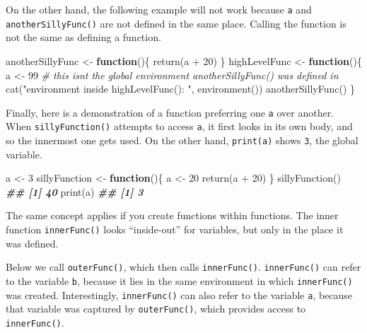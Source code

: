 \documentclass[
  12pt,
]{krantz}
\makeatletter
\newenvironment{Shaded}{\begin{snugshade}}{\end{snugshade}}
\newcommand{\CommentTok}[1]{\textcolor[rgb]{0.37,0.37,0.37}{\textit{#1}}}
\newcommand{\ControlFlowTok}[1]{\textcolor[rgb]{0.27,0.27,0.27}{\textbf{#1}}}
\newcommand{\DecValTok}[1]{\textcolor[rgb]{0.06,0.06,0.06}{#1}}
\newcommand{\DocumentationTok}[1]{\textcolor[rgb]{0.37,0.37,0.37}{\textbf{\textit{#1}}}}
\newcommand{\FunctionTok}[1]{\textcolor[rgb]{0,0,0}{#1}}
\newcommand{\NormalTok}[1]{#1}
\newcommand{\OtherTok}[1]{\textcolor[rgb]{0.37,0.37,0.37}{#1}}
\newcommand{\SpecialCharTok}[1]{\textcolor[rgb]{0,0,0}{#1}}
\newcommand{\StringTok}[1]{\textcolor[rgb]{0.5,0.5,0.5}{#1}}
\newenvironment{kframe}{%
\medskip{}
\setlength{\fboxsep}{.8em}
 \def\at@end@of@kframe{}%
 \ifinner\ifhmode%
  \def\at@end@of@kframe{\end{minipage}}%
  \begin{minipage}{\columnwidth}%
 \fi\fi%
 \def\FrameCommand##1{\hskip\@totalleftmargin \hskip-\fboxsep
 \colorbox{shadecolor}{##1}\hskip-\fboxsep
     \hskip-\linewidth \hskip-\@totalleftmargin \hskip\columnwidth}%
 \MakeFramed {\advance\hsize-\width
   \@totalleftmargin\z@ \linewidth\hsize
   \@setminipage}}%
 {\par\unskip\endMakeFramed%
 \at@end@of@kframe}
\renewenvironment{Shaded}{\begin{kframe}}{\end{kframe}}
\makeatother
\begin{document}
On the other hand, the following example will not work because \texttt{a} and \texttt{anotherSillyFunc()} are not defined in the same place. Calling the function is not the same as defining a function.

\begin{Shaded}
\begin{Highlighting}[]
\NormalTok{anotherSillyFunc }\OtherTok{\textless{}{-}} \ControlFlowTok{function}\NormalTok{()\{}
  \FunctionTok{return}\NormalTok{(a }\SpecialCharTok{+} \DecValTok{20}\NormalTok{) }
\NormalTok{\}}
\NormalTok{highLevelFunc }\OtherTok{\textless{}{-}} \ControlFlowTok{function}\NormalTok{()\{}
\NormalTok{  a }\OtherTok{\textless{}{-}} \DecValTok{99}
  \CommentTok{\# this isn\textquotesingle{}t the global environment anotherSillyFunc() was defined in}
  \FunctionTok{cat}\NormalTok{(}\StringTok{"environment inside highLevelFunc(): "}\NormalTok{, }\FunctionTok{environment}\NormalTok{())}
  \FunctionTok{anotherSillyFunc}\NormalTok{()}
\NormalTok{\}}
\end{Highlighting}
\end{Shaded}

Finally, here is a demonstration of a function preferring one \texttt{a} over another. When \texttt{sillyFunction()} attempts to access \texttt{a}, it first looks in its own body, and so the innermost one gets used. On the other hand, \texttt{print(a)} shows \texttt{3}, the global variable.

\begin{Shaded}
\begin{Highlighting}[]
\NormalTok{a }\OtherTok{\textless{}{-}} \DecValTok{3}
\NormalTok{sillyFunction }\OtherTok{\textless{}{-}} \ControlFlowTok{function}\NormalTok{()\{}
\NormalTok{  a }\OtherTok{\textless{}{-}} \DecValTok{20}
  \FunctionTok{return}\NormalTok{(a }\SpecialCharTok{+} \DecValTok{20}\NormalTok{) }
\NormalTok{\}}
\FunctionTok{sillyFunction}\NormalTok{()}
\DocumentationTok{\#\# [1] 40}
\FunctionTok{print}\NormalTok{(a)}
\DocumentationTok{\#\# [1] 3}
\end{Highlighting}
\end{Shaded}

The same concept applies if you create functions within functions. The inner function \texttt{innerFunc()} looks ``inside-out'' for variables, but only in the place it was defined.

Below we call \texttt{outerFunc()}, which then calls \texttt{innerFunc()}. \texttt{innerFunc()} can refer to the variable \texttt{b}, because it lies in the same environment in which \texttt{innerFunc()} was created. Interestingly, \texttt{innerFunc()} can also refer to the variable \texttt{a}, because that variable was captured by \texttt{outerFunc()}, which provides access to \texttt{innerFunc()}.
\end{document}
